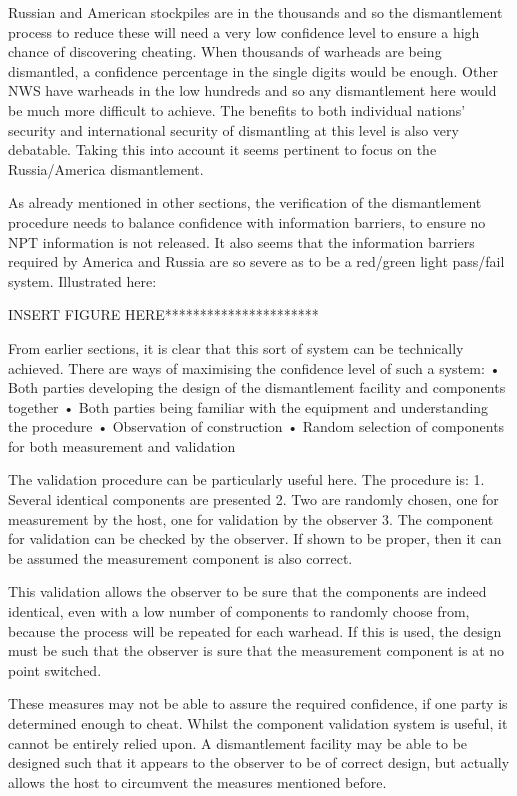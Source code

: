 \documentclass[twocolumn,a4paper]{article}
\begin{document}
Russian and American stockpiles are in the thousands and so the 
dismantlement process to reduce these will need a very low confidence 
level to ensure a high chance of discovering cheating. When thousands 
of warheads are being dismantled, a confidence percentage in the single 
digits would be enough. Other NWS have warheads in the low hundreds 
and so any dismantlement here would be much more difficult to achieve.
The benefits to both individual nations' security and international 
security of dismantling at this level is also very debatable. Taking 
this into account it seems pertinent to focus on the Russia/America 
dismantlement.

As already mentioned in other sections, the verification of the 
dismantlement procedure needs to balance confidence with information
barriers, to ensure no NPT information is not released. It also seems
that the information barriers required by America and Russia are so 
severe as to be a red/green light pass/fail system. Illustrated here:

INSERT FIGURE HERE**********************

From earlier sections, it is clear that this sort of system can be 
technically achieved. There are ways of maximising the confidence level 
of such a system:
• Both parties developing the design of the dismantlement facility and components together
• Both parties being familiar with the equipment and understanding the procedure
• Observation of construction
• Random selection of components for both measurement and validation

The validation procedure can be particularly useful here. The procedure is:
1. Several identical components are presented
2. Two are randomly chosen, one for measurement by the host, one for validation by the
observer
3. The component for validation can be checked by the observer. If shown to be proper, 
then it can be assumed the measurement component is also correct.

This validation allows the observer to be sure that the components are 
indeed identical, even with a low number of components to randomly choose 
from, because the process will be repeated for each warhead. If this is 
used, the design must be such that the observer is sure that the measurement
component is at no point switched.

These measures may not be able to assure the required confidence, if one 
party is determined enough to cheat. Whilst the component validation system
is useful, it cannot be entirely relied upon. A dismantlement facility may 
be able to be designed such that it appears to the observer to be of correct
design, but actually allows the host to circumvent the measures mentioned before.
\end{document}

